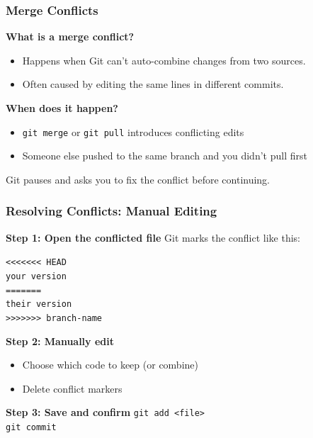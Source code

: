 \documentclass[aspectratio=169]{beamer}
\begin{document}
\begin{frame}
  \frametitle{Merge Conflicts}

  \textbf{What is a merge conflict?}
  \begin{itemize}
    \item Happens when Git can't auto-combine changes from two sources.
    \item Often caused by editing the same lines in different commits.
  \end{itemize}

  \vspace{1em}
  \textbf{When does it happen?}
  \begin{itemize}
    \item \texttt{git merge} or \texttt{git pull} introduces conflicting edits
    \item Someone else pushed to the same branch and you didn’t pull first
  \end{itemize}

  \vspace{1em}
  Git pauses and asks you to fix the conflict before continuing.
\end{frame}


\begin{frame}
  \frametitle{Resolving Conflicts: Manual Editing}

  \textbf{Step 1: Open the conflicted file}  
  Git marks the conflict like this:

  \texttt{<<<<<<< HEAD} \\
  \texttt{your version} \\
  \texttt{=======} \\
  \texttt{their version} \\
  \texttt{>>>>>>> branch-name}

  \vspace{1em}
  \textbf{Step 2: Manually edit}
  \begin{itemize}
    \item Choose which code to keep (or combine)
    \item Delete conflict markers
  \end{itemize}

  \vspace{1em}
  \textbf{Step 3: Save and confirm}
  \texttt{git add <file>} \\
  \texttt{git commit}

\end{frame}
\end{document}
